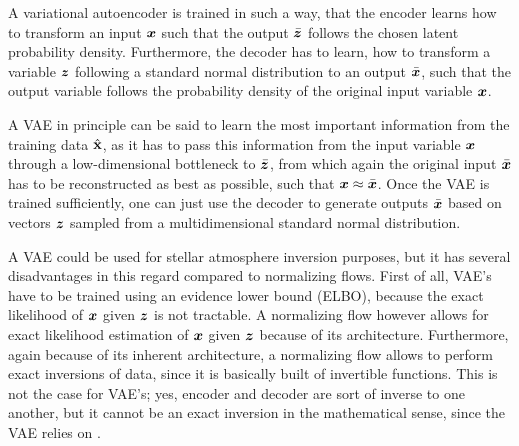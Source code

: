 \documentclass[a4paper,11pt]{report}
\def\lk#1{{\color{black}{#1}}}
\begin{document}
A variational autoencoder is trained in such a way, that the encoder learns how to transform an input $\bm{x}$ such that the output $\bar{\bm{z}}$ follows the chosen latent probability density. Furthermore, the decoder has to learn, how to transform a variable $\bm{z}$ following a standard normal distribution to an output $\bar{\bm{x}}$, such that the output variable follows the probability density of the original input variable $\bm{x}$.

A VAE in principle can be said to learn the most important information from the training data $\hat{\boldsymbol{\mathbf{x}}}$, as it has to pass this information from the input variable $\bm{x}$ through a low-dimensional bottleneck to $\bar{\bm{z}}$, from which again the original input $\bar{\bm{x}}$ has to be reconstructed as best as possible, such that $\bm{x} \approx \bar{\bm{x}}$. Once the VAE is trained sufficiently, one can just use the decoder to generate outputs $\bar{\bm{x}}$ based on vectors $\bm{z}$ sampled from a multidimensional standard normal distribution.

A VAE could be used for stellar atmosphere inversion purposes, but it has several disadvantages in this regard compared to normalizing flows. First of all, VAE's have to be trained using an evidence lower bound (ELBO), because the exact likelihood of $\bm{x}$ given $\bm{z}$ is not tractable. A normalizing flow however allows for exact likelihood estimation of $\bm{x}$ given $\bm{z}$ because of its architecture. Furthermore, again because of its inherent architecture, a normalizing flow allows to perform exact inversions of data, since it is basically built of invertible functions. This is not the case for VAE's; yes, encoder and decoder are sort of inverse to one another, but it cannot be an exact inversion in the mathematical sense, since the VAE relies on \lk{dimensionality reduction}.
\end{document}
